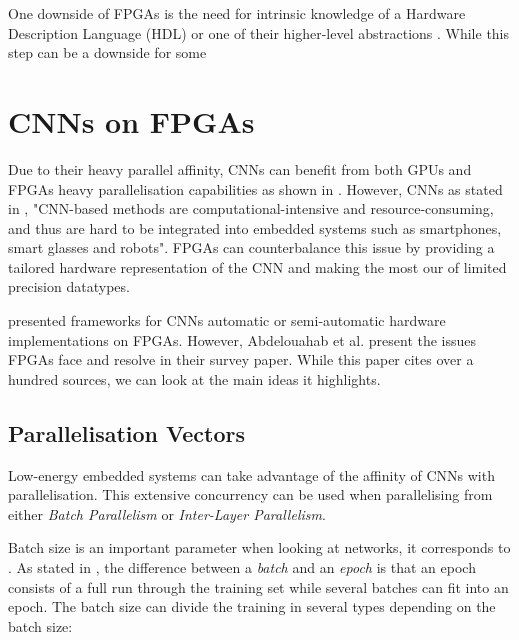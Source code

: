 One downside of FPGAs is the need for intrinsic knowledge of a Hardware Description Language (HDL) or one of their higher-level abstractions \cite{XuanSang2014}. While this step can be a downside for some


\section{CNNs on FPGAs}

Due to their heavy parallel affinity, CNNs can benefit from both GPUs and FPGAs heavy parallelisation capabilities as shown in \cite{}. However, CNNs as stated in \cite{Jahanshahi2019}, "CNN-based methods are computational-intensive and resource-consuming, and thus are hard to be integrated into embedded systems such as smartphones, smart glasses and robots". FPGAs can counterbalance this issue by providing a tailored hardware representation of the CNN and making the most our of limited precision datatypes.

\cite{} presented frameworks for CNNs automatic or semi-automatic hardware implementations on FPGAs. However, Abdelouahab et al. \cite{Abdelouahab2018} present the issues FPGAs face and resolve in their survey paper. While this paper cites over a hundred sources, we can look at the main ideas it highlights.

\subsection{Parallelisation Vectors}

Low-energy embedded systems can take advantage of the affinity of CNNs with parallelisation. This extensive concurrency can be used when parallelising from either \emph{Batch Parallelism} or \emph{Inter-Layer Parallelism}.

Batch size is an important parameter when looking at networks, it corresponds to  \cite{MachineLearningMastery}. As stated in \cite{MachineLearningMastery}, the difference between a \emph{batch} and an \emph{epoch} is that an epoch consists of a full run through the training set while several batches can fit into an epoch. The batch size can divide the training in several types depending on the batch size:

